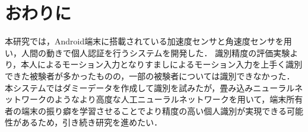 \section{おわりに}
本研究では，Android端末に搭載されている加速度センサと角速度センサを用い，人間の動きで個人認証を行うシステムを開発した．
識別精度の評価実験より，本人によるモーション入力となりすましによるモーション入力を上手く識別できた被験者が多かったものの，一部の被験者については識別できなかった．
本システムではダミーデータを作成して識別を試みたが，畳み込みニューラルネットワークのようなより高度な人工ニューラルネットワークを用いて，端末所有者の端末の振り癖を学習させることでより精度の高い個人識別が実現できる可能性があるため，引き続き研究を進めたい．
